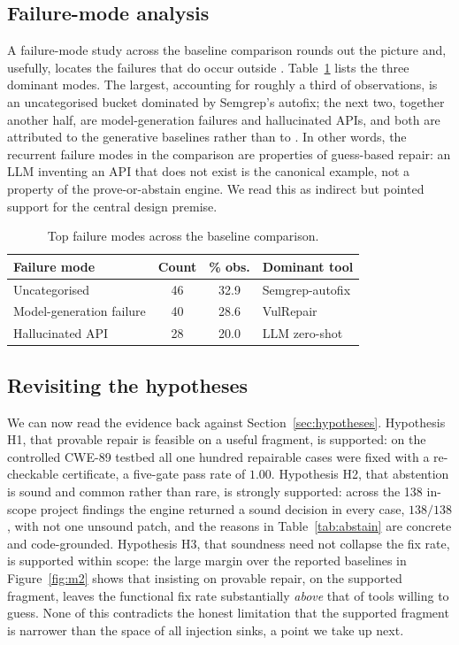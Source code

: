 \subsection{Failure-mode analysis}
\label{sec:res-failures}

A failure-mode study across the baseline comparison rounds out the picture
and, usefully, locates the failures that do occur outside \irsam{}.
Table~\ref{tab:failures} lists the three dominant modes. The largest,
accounting for roughly a third of observations, is an uncategorised bucket
dominated by Semgrep's autofix; the next two, together another half, are
model-generation failures and hallucinated APIs, and both are attributed to
the generative baselines rather than to \irsam{}. In other words, the
recurrent failure modes in the comparison are properties of guess-based
repair: an LLM inventing an API that does not exist is the canonical
example, not a property of the prove-or-abstain engine. We read this as indirect
but pointed support for the central design premise.

\begin{table}[ht]
\centering
\caption{Top failure modes across the baseline comparison.}
\label{tab:failures}
\begin{tabular}{p{5.4cm}ccp{3.0cm}}
\hline
\textbf{Failure mode} & \textbf{Count} & \textbf{\% obs.} & \textbf{Dominant tool} \\
\hline
Uncategorised            & 46 & 32.9 & Semgrep-autofix \\
Model-generation failure & 40 & 28.6 & VulRepair \\
Hallucinated API         & 28 & 20.0 & LLM zero-shot \\
\hline
\end{tabular}
\end{table}

\subsection{Revisiting the hypotheses}
\label{sec:res-hypotheses}

We can now read the evidence back against Section~\ref{sec:hypotheses}.
Hypothesis H1, that provable repair is feasible on a useful fragment, is
supported: on the controlled CWE-89 testbed all one hundred repairable cases
were fixed with a re-checkable certificate, a five-gate pass rate of $1.00$.
Hypothesis H2, that abstention is sound and common rather than rare, is
strongly supported: across the 138 in-scope project findings the engine
returned a sound decision in every case, $138/138$, with not one unsound
patch, and the reasons in Table~\ref{tab:abstain} are concrete and
code-grounded. Hypothesis H3, that soundness need not collapse the fix rate,
is supported within scope: the large margin over the reported baselines in
Figure~\ref{fig:m2} shows that insisting on provable repair, on the supported
fragment, leaves the functional fix rate substantially \emph{above} that of
tools willing to guess. None of this contradicts the honest limitation that
the supported fragment is narrower than the space of all injection sinks, a
point we take up next.


